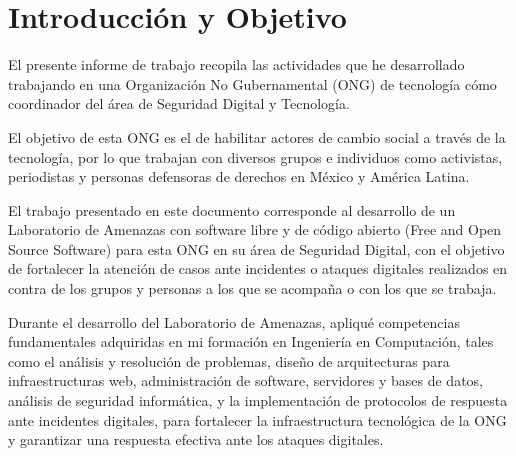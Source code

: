 \documentclass[12pt]{caltech_thesis}
\begin{document}
\chapter{Introducción y Objetivo}


El presente informe de trabajo recopila las actividades que he desarrollado trabajando en una Organización No Gubernamental (ONG)  de tecnología cómo coordinador del área de Seguridad Digital y Tecnología.

El objetivo de esta ONG es el de habilitar actores de cambio social a través de la tecnología, por lo que trabajan con diversos grupos e individuos como activistas, periodistas y personas defensoras de derechos en México y América Latina.

El trabajo presentado en este documento corresponde al desarrollo de un Laboratorio de Amenazas  con software libre y de código abierto (Free and Open Source Software)  para esta ONG en su área de Seguridad Digital, con el objetivo de fortalecer la atención de casos ante incidentes  o ataques digitales  realizados en contra de los grupos y personas a los que se acompaña o con los que se trabaja.

Durante el desarrollo del Laboratorio de Amenazas, apliqué competencias fundamentales adquiridas en mi formación en Ingeniería en Computación, tales como el análisis y resolución de problemas, diseño de arquitecturas para infraestructuras web, administración de software, servidores y bases de datos, análisis de seguridad informática, y la implementación de protocolos de respuesta ante incidentes digitales, para fortalecer la infraestructura tecnológica de la ONG y garantizar una respuesta efectiva ante los ataques digitales.


\end{document}
